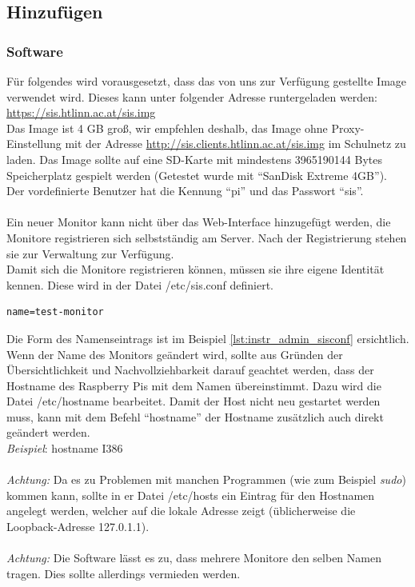 \subsection{Hinzufügen}

\subsubsection{Software}
\label{sec:instr_monitor_software}
Für folgendes wird vorausgesetzt, dass das von uns zur Verfügung gestellte Image verwendet wird. Dieses kann unter folgender Adresse runtergeladen werden:\\ \href{https://sis.htlinn.ac.at/sis.img}{https://sis.htlinn.ac.at/sis.img}\\
Das Image ist 4 GB groß, wir empfehlen deshalb, das Image ohne Proxy-Einstellung mit der Adresse \href{http://sis.clients.htlinn.ac.at/sis.img}{http://sis.clients.htlinn.ac.at/sis.img} im Schulnetz zu laden. Das Image sollte auf eine SD-Karte mit mindestens 3965190144 Bytes Speicherplatz gespielt werden (Getestet wurde mit \enquote{SanDisk Extreme 4GB}).\\
Der vordefinierte Benutzer hat die Kennung \enquote{pi} und das Passwort \enquote{sis}.\\
\\
Ein neuer Monitor kann nicht über das Web-Interface hinzugefügt werden, die Monitore registrieren sich selbstständig am Server. Nach der Registrierung stehen sie zur Verwaltung zur Verfügung.\\
Damit sich die Monitore registrieren können, müssen sie ihre eigene Identität kennen. Diese wird in der Datei /etc/sis.conf definiert.\\

\begin{lstlisting}[style=custom,  caption={Beispiel /etc/sis.conf},label={lst:instr_admin_sisconf}]
name=test-monitor
\end{lstlisting}
Die Form des Namenseintrags ist im Beispiel  \autoref{lst:instr_admin_sisconf} ersichtlich.\\
Wenn der Name des Monitors geändert wird, sollte aus Gründen der Übersichtlichkeit und Nachvollziehbarkeit darauf geachtet werden, dass der Hostname des Raspberry Pis mit dem Namen übereinstimmt. Dazu wird die Datei /etc/hostname bearbeitet. Damit der Host nicht neu gestartet werden muss, kann mit dem Befehl \enquote{hostname} der Hostname zusätzlich auch direkt geändert werden. \\
\textit{Beispiel}: hostname I386\\
\\
\textit{Achtung:} Da es zu Problemen mit manchen Programmen (wie zum Beispiel \textit{sudo}) kommen kann, sollte in er Datei /etc/hosts ein Eintrag für den Hostnamen angelegt werden, welcher auf die lokale Adresse zeigt (üblicherweise die Loopback-Adresse 127.0.1.1).\\
\\
\textit{Achtung:} Die Software lässt es zu, dass mehrere Monitore den selben Namen tragen. Dies sollte allerdings vermieden werden.

